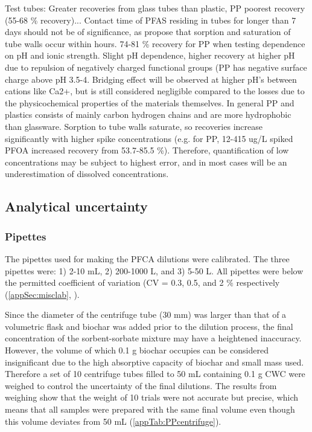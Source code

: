 Test tubes: Greater recoveries from glass tubes than plastic, PP poorest recovery (55-68 \% recovery)... Contact time of PFAS residing in tubes for longer than 7 days should not be of significance, as \citep{Lath2019labsorb} propose that sorption and saturation of tube walls occur within hours. 74-81 \% recovery for PP when testing dependence on pH and ionic strength. Slight pH dependence, higher recovery at higher pH due to repulsion of negatively charged functional groups (PP has negative surface charge above pH 3.5-4. Bridging effect will be observed at higher pH's between cations like Ca2+, but is still considered negligible compared to the losses due to the physicochemical properties of the materials themselves. In general PP and plastics consists of mainly carbon hydrogen chains and are more hydrophobic than glassware. Sorption to tube walls saturate, so recoveries increase significantly with higher spike concentrations (e.g. for PP, 12-415 ug/L spiked PFOA increased recovery from 53.7-85.5 \%). Therefore, quantification of low concentrations may be subject to highest error, and in most cases will be an underestimation of dissolved concentrations. 

\subsection{Analytical uncertainty}

\subsubsection{Pipettes} 
The pipettes used for making the PFCA dilutions were calibrated. The three pipettes were: 1) 2-10 mL, 2) 200-1000 \textmu L, and 3) 5-50 \textmu L. All pipettes were below the permitted coefficient of variation (CV = 0.3, 0.5, and 2 $\%$ respectively (\cref{appSec:misclab}, ).

Since the diameter of the centrifuge tube (30 mm) was larger than that of a volumetric flask and biochar was added prior to the dilution process, the final concentration of the sorbent-sorbate mixture may have a heightened inaccuracy. However, the volume of which 0.1 g biochar occupies can be considered insignificant due to the high absorptive capacity of biochar and small mass used. Therefore a set of 10 centrifuge tubes filled to 50 mL containing 0.1 g CWC were weighed to control the uncertainty of the final dilutions. The results from weighing show that the weight of 10 trials were not accurate but precise, which means that all samples were prepared with the same final volume even though this volume deviates from 50 mL (\cref{appTab:PPcentrifuge}). 

